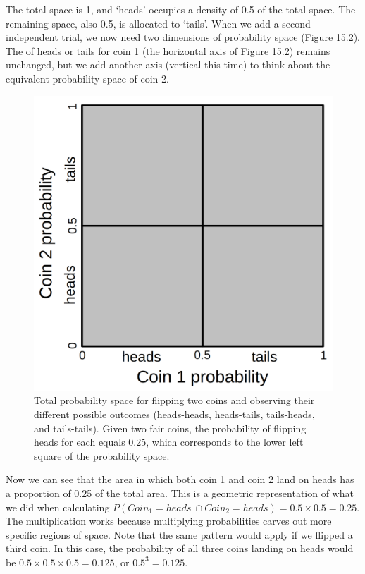 \documentclass[
  openany]{krantz}
\begin{document}
The total  space is 1, and `heads' occupies a density of 0.5 of the total space.
The remaining space, also 0.5, is allocated to `tails'.
When we add a second independent trial, we now need two dimensions of probability space (Figure 15.2).
The  of heads or tails for coin 1 (the horizontal axis of Figure 15.2) remains unchanged, but we add another axis (vertical this time) to think about the equivalent probability space of coin 2.

\begin{figure}
\includegraphics[width=1\linewidth]{img/coin2_probability} \caption{Total probability space for flipping two coins and observing their different possible outcomes (heads-heads, heads-tails, tails-heads, and tails-tails). Given two fair coins, the probability of flipping heads for each equals 0.25, which corresponds to the lower left square of the probability space.}\label{fig:unnamed-chunk-51}
\end{figure}

Now we can see that the area in which both coin 1 and coin 2 land on heads has a proportion of 0.25 of the total area.
This is a geometric representation of what we did when calculating \(P(Coin_{1} = heads\:\cap Coin_{2} = heads) = 0.5 \times 0.5 = 0.25.\)
The multiplication works because multiplying probabilities carves out more specific regions of  space.
Note that the same pattern would apply if we flipped a third coin.
In this case, the probability of all three coins landing on heads would be \(0.5 \times 0.5 \times 0.5 = 0.125\), or \(0.5^{3} = 0.125\).
\end{document}
